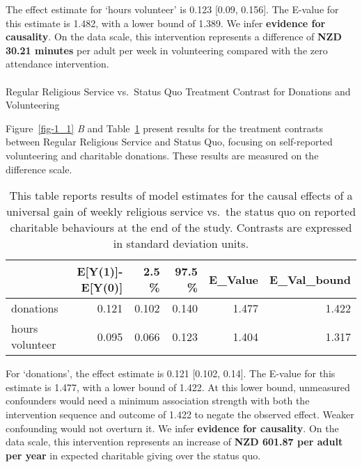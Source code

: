 \documentclass[
  single column]{article}
\makeatletter
\let\oldparagraph\paragraph
\renewcommand{\paragraph}{
    \@ifstar
      \xxxParagraphStar
      \xxxParagraphNoStar
  }
\newcommand{\xxxParagraphStar}[1]{\oldparagraph*{#1}\mbox{}}
\newcommand{\xxxParagraphNoStar}[1]{\oldparagraph{#1}\mbox{}}
\makeatother
\begin{document}
The effect estimate for `hours volunteer' is 0.123 {[}0.09, 0.156{]}.
The E-value for this estimate is 1.482, with a lower bound of 1.389. We
infer \textbf{evidence for causality}. On the data scale, this
intervention represents a difference of \textbf{NZD 30.21 minutes} per
adult per week in volunteering compared with the zero attendance
intervention.

\paragraph{Regular Religious Service vs.~Status Quo Treatment Contrast
for Donations and
Volunteering}\label{regular-religious-service-vs.-status-quo-treatment-contrast-for-donations-and-volunteering}

Figure~\ref{fig-1_1} \emph{B} and Table~\ref{tbl-1_2} present results
for the treatment contrasts between Regular Religious Service and Status
Quo, focusing on self-reported volunteering and charitable donations.
These results are measured on the difference scale.

\begin{longtable}[]{@{}lrrrrr@{}}

\caption{\label{tbl-1_2}This table reports results of model estimates
for the causal effects of a universal gain of weekly religious service
vs.~the status quo on reported charitable behaviours at the end of the
study. Contrasts are expressed in standard deviation units.}

\tabularnewline

\toprule\noalign{}
& E{[}Y(1){]}-E{[}Y(0){]} & 2.5 \% & 97.5 \% & E\_Value &
E\_Val\_bound \\
\midrule\noalign{}
\endhead
\bottomrule\noalign{}
\endlastfoot
donations & 0.121 & 0.102 & 0.140 & 1.477 & 1.422 \\
hours volunteer & 0.095 & 0.066 & 0.123 & 1.404 & 1.317 \\

\end{longtable}

For `donations', the effect estimate is 0.121 {[}0.102, 0.14{]}. The
E-value for this estimate is 1.477, with a lower bound of 1.422. At this
lower bound, unmeasured confounders would need a minimum association
strength with both the intervention sequence and outcome of 1.422 to
negate the observed effect. Weaker confounding would not overturn it. We
infer \textbf{evidence for causality}. On the data scale, this
intervention represents an increase of \textbf{NZD 601.87 per adult per
year} in expected charitable giving over the status quo.
\end{document}
